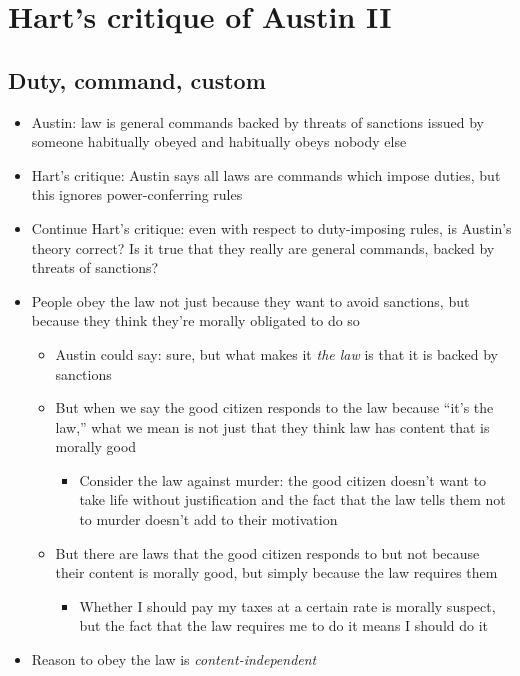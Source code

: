 \hypertarget{harts-critique-of-austin-ii}{%
\section{Hart's critique of Austin
II}\label{harts-critique-of-austin-ii}}

\hypertarget{duty-command-custom}{%
\subsection{Duty, command, custom}\label{duty-command-custom}}

\begin{itemize}
\tightlist
\item
  Austin: law is general commands backed by threats of sanctions issued
  by someone habitually obeyed and habitually obeys nobody else
\item
  Hart's critique: Austin says all laws are commands which impose
  duties, but this ignores power-conferring rules
\item
  Continue Hart's critique: even with respect to duty-imposing rules, is
  Austin's theory correct? Is it true that they really are general
  commands, backed by threats of sanctions?
\item
  People obey the law not just because they want to avoid sanctions, but
  because they think they're morally obligated to do so

  \begin{itemize}
  \tightlist
  \item
    Austin could say: sure, but what makes it \emph{the law} is that it
    is backed by sanctions
  \item
    But when we say the good citizen responds to the law because ``it's
    the law,'' what we mean is not just that they think law has content
    that is morally good

    \begin{itemize}
    \tightlist
    \item
      Consider the law against murder: the good citizen doesn't want to
      take life without justification and the fact that the law tells
      them not to murder doesn't add to their motivation
    \end{itemize}
  \item
    But there are laws that the good citizen responds to but not because
    their content is morally good, but simply because the law requires
    them

    \begin{itemize}
    \tightlist
    \item
      Whether I should pay my taxes at a certain rate is morally
      suspect, but the fact that the law requires me to do it means I
      should do it
    \end{itemize}
  \end{itemize}
\item
  Reason to obey the law is \emph{content-independent}


\end{itemize}
